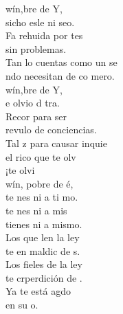 \documentclass[12pt]{article}
\begin{document}
\begin{multicols*}{2}
\begin{cancion}%
	wín,bre de Y,  \\
	sicho esle ni seo.\\
	Fa rehuida por tes \\
sin problemas.\\
	Tan lo cuentas como un se \\
	ndo necesitan de co mero.\\
\jump
	wín,bre de Y,  \\
	e olvio d tra.\\
	Recor para ser\\
	revulo de conciencias.\\
	Tal z para causar inquie\\
	el rico que te olv  \\
	¡te olvi \\
\jump
	wín, pobre de é, \\
	 te nes ni a ti mo.\\
	te nes ni a  mis \\
	tienes ni a mismo.\\
\jump
	Los que len la ley \\
	te en maldic de s.\\
Los fieles de la ley \\
	te crperdición de .\\
\jump
	Ya te está agdo\\
	en su o.\\
\end{cancion}%


\end{multicols*}
\end{document}
